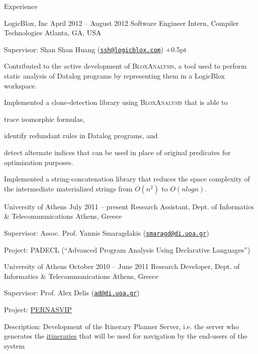 \documentclass{resume}
\begin{document}
\begin{rSection}{Experience}

\begin{rSubsection}{LogicBlox, Inc}
  {April 2012 -- August 2012}
  {Software Engineer Intern, Compiler Technologies}
  {Atlanta, GA, USA}
\item Supervisor: Shan Shan Huang
  (\href{mailto:ssh@logicblox.com}{\nolinkurl{ssh@logicblox.com}})
\itemsep +0.5pt %
\item Contributed to the active development of \textsc{BloxAnalysis},
  a tool used to perform static analysis of Datalog programs
  by representing them in a LogicBlox workspace.
\item Implemented a clone-detection library using \textsc{BloxAnalysis}
  that is able to
  \begin{inparaenum}[(i)]
  \item trace isomorphic formulas,
  \item identify redundant rules in Datalog programs, and
  \item detect alternate indices that can be used in place of original
    predicates for optimization purposes.
  \end{inparaenum}
\item Implemented a string-concatenation library that reduces the
  space complexity of the intermediate materialized strings from
  $O(n^2)$ to $O(nlogn)$.
\end{rSubsection}


\begin{rSubsection}
  {University of Athens}
  {July 2011 -- present}
  {Research Assistant, Dept. of Informatics \& Telecommunications}
  {Athens, Greece}
\item Supervisor: Assoc. Prof. Yannis Smaragdakis
  (\href{mailto:smaragd@di.uoa.gr}{\nolinkurl{smaragd@di.uoa.gr}})
\item Project: PADECL (``Advanced Program Analysis Using Declarative
  Languages'')
\end{rSubsection}


\begin{rSubsection}
  {University of Athens}
  {October 2010 -- June 2011}
  {Research Developer, Dept. of Informatics \& Telecommunications}
  {Athens, Greece}
\item Supervisor: Prof. Alex Delis
  (\href{mailto:ad@di.uoa.gr}{\nolinkurl{ad@di.uoa.gr}})
\item Project: \href{http://pernasvip.di.uoa.gr/index.php}{PERNASVIP}
\item Description: Development of the Itinerary Planner Server,
  i.e. the server who generates the
  \href{http://pernasvip.di.uoa.gr/index.php/gen-spef/itinerary-example}{itineraries}
  that will be used for navigation by the end-users of the system
\end{rSubsection}

\end{rSection}
\end{document}
